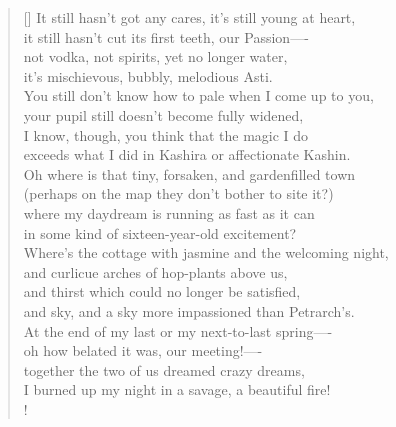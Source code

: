 \documentclass[]{article}
\begin{document}
\settowidth{\versewidth}{ It still hasn't got any cares, it's still young at heart,}
\begin{verse}[\versewidth]
It still hasn't got any cares, it's still young at heart,\\
it still hasn't cut its first teeth, our Passion—- \\
not vodka, not spirits, yet no longer water,\\
it's mischievous, bubbly, melodious Asti.\\
You still don't know how to pale when I come up to you,\\
your pupil still doesn't become fully widened,\\
I know, though, you think that the magic I do\\
exceeds what I did in Kashira or affectionate Kashin.\\
Oh where is that tiny, forsaken, and gardenfilled town\\
(perhaps on the map they don't bother to site it?)\\
where my daydream is running as fast as it can\\
in some kind of sixteen-year-old excitement?\\
Where's the cottage with jasmine and the welcoming night,\\
and curlicue arches of hop-plants above us,\\
and thirst which could no longer be satisfied,\\
and sky, and a sky more impassioned than Petrarch's.\\
At the end of my last or my next-to-last spring—- \\
oh how belated it was, our meeting!—- \\
together the two of us dreamed crazy dreams,\\
I burned up my night in a savage, a beautiful fire!\\!
\end{verse}
\newpage 
\end{document}
